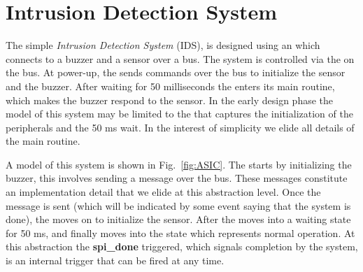 

\section{Intrusion Detection System}
\label{sec:secbot}

The simple \emph{Intrusion Detection System} (IDS), is designed using an \ASIC which connects to a buzzer and a sensor over a \SPI bus. The system is controlled via the \ASIC on the \SPI bus. At power-up, the \ASIC sends commands over the \SPI bus to initialize the sensor and the buzzer. After waiting for 50 milliseconds the \ASIC enters its main routine, which makes the buzzer respond to the sensor. In the early design phase the \statechart model of this system may be limited to the \ASIC that captures the initialization of the peripherals and the 50 ms wait. In the interest of simplicity we elide all details of the main routine.

A \statechart model of this system is shown in Fig.~\ref{fig:ASIC}. The \ASIC starts by initializing the buzzer, this involves sending a message over the \SPI bus. These messages constitute an implementation detail that we elide at this abstraction level. Once the message is sent (which will be indicated by some event saying that the \SPI system is done), the \ASIC moves on to initialize the sensor. After the \ASIC moves into a waiting state for 50 ms, and finally moves into the state which represents normal operation. At this abstraction the \textbf{spi\_done} triggered, which signals completion by the \SPI system, is an internal trigger that can be fired at any time.

